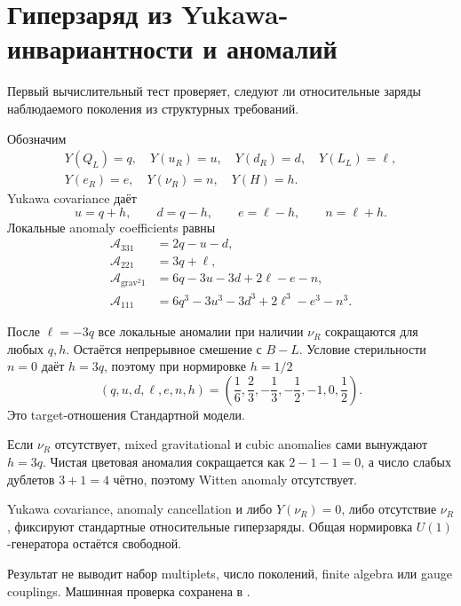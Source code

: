 \chapter{Гиперзаряд из Yukawa-инвариантности и аномалий}

Первый вычислительный тест проверяет, следуют ли относительные заряды
наблюдаемого поколения из структурных требований.

Обозначим
\begin{equation}
\begin{gathered}
Y(Q_L)=q,\quad Y(u_R)=u,\quad Y(d_R)=d,\quad Y(L_L)=\ell,\\
Y(e_R)=e,\quad Y(\nu_R)=n,\quad Y(H)=h.
\end{gathered}
\end{equation}
Yukawa covariance даёт
\begin{equation}
u=q+h,\qquad d=q-h,\qquad e=\ell-h,\qquad n=\ell+h.
\end{equation}
Локальные anomaly coefficients равны
\begin{align}
\mathcal A_{331}&=2q-u-d,\\
\mathcal A_{221}&=3q+\ell,\\
\mathcal A_{\mathrm{grav}^2 1}&=6q-3u-3d+2\ell-e-n,\\
\mathcal A_{111}&=6q^3-3u^3-3d^3+2\ell^3-e^3-n^3.
\end{align}

После \(\ell=-3q\) все локальные аномалии при наличии \(\nu_R\)
сокращаются для любых \(q,h\). Остаётся непрерывное смешение с \(B-L\).
Условие стерильности \(n=0\) даёт \(h=3q\), поэтому при нормировке
\(h=1/2\)
\begin{equation}
\boxed{(q,u,d,\ell,e,n,h)=
\left(\frac16,\frac23,-\frac13,-\frac12,-1,0,\frac12\right).}
\end{equation}
Это target-отношения Стандартной модели.

Если \(\nu_R\) отсутствует, mixed gravitational и cubic anomalies сами
вынуждают \(h=3q\). Чистая цветовая аномалия сокращается как
\(2-1-1=0\), а число слабых дублетов \(3+1=4\) чётно, поэтому Witten
anomaly отсутствует.

\begin{theorem}
Yukawa covariance, anomaly cancellation и либо \(Y(\nu_R)=0\), либо
отсутствие \(\nu_R\), фиксируют стандартные относительные гиперзаряды.
Общая нормировка \(U(1)\)-генератора остаётся свободной.
\end{theorem}

Результат не выводит набор multiplets, число поколений, finite algebra или
gauge couplings. Машинная проверка сохранена в
.